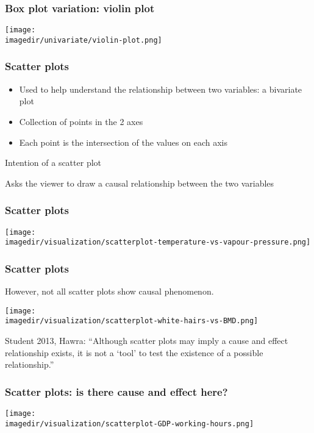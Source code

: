 \begin{frame}\frametitle{Box plot variation: violin plot}
	\begin{center}
		\texttt{[image: \\imagedir/univariate/violin-plot.png]}
	\end{center}
\end{frame}

\begin{frame}\frametitle{Scatter plots}
	\begin{itemize}
		\item	Used to help understand the relationship between two variables: a bivariate plot 
		\item	Collection of points in the 2 axes 
		\item	Each point is the intersection of the values on each axis 
	\end{itemize}
	\begin{block}
		{Intention of a scatter plot} 
		\begin{center}
			Asks the viewer to draw a causal relationship between the two variables 
		\end{center}
	\end{block}
\end{frame}

\begin{frame}\frametitle{Scatter plots}
	\begin{center}
		\texttt{[image: \\imagedir/visualization/scatterplot-temperature-vs-vapour-pressure.png]}
	\end{center}
\end{frame}

\begin{frame}\frametitle{Scatter plots}
	However, not all scatter plots show causal phenomenon. 
	\begin{center}
		\texttt{[image: \\imagedir/visualization/scatterplot-white-hairs-vs-BMD.png]}
	\end{center}
	\vspace{-12pt}
	Student 2013, Hawra: {\small ``Although scatter plots may imply a cause and effect relationship exists, it is not a `tool' to test the existence of a possible relationship.''}
\end{frame}

\begin{frame}\frametitle{Scatter plots: is there cause and effect here?}
	\begin{center}
		\texttt{[image: \\imagedir/visualization/scatterplot-GDP-working-hours.png]}
	\end{center}
\end{frame}

